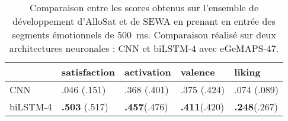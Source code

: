 \begin{table}[htp!]
    \centering
    \begin{tabular}{|l|l||l|l|l|}
        \hline
                    &satisfaction &activation &valence &liking \\
        \hline
        CNN         &.046 (.151)   &.368 (.401) &.375 (.424) &.074 (.089)\\
        biLSTM-4    &\textbf{.503} (.517)   &\textbf{.457}(.476) &\textbf{.411}(.420) &\textbf{.248}(.267) \\
        \hline
    \end{tabular}
    \caption{Comparaison entre les scores obtenus sur l'ensemble de développement d'AlloSat et de SEWA en prenant en entrée des segments émotionnels de 500~ms. Comparaison réalisé sur deux architectures neuronales : CNN et biLSTM-4 avec eGeMAPS-47.}
    \label{tab:pasAnnotation}
\end{table}
